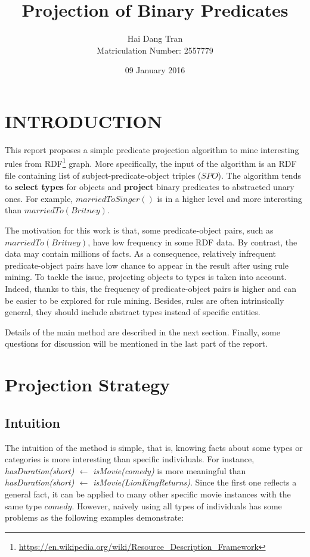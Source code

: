 \documentclass{acm_proc_article-sp}
\begin{document}
\title{Projection of Binary Predicates}
\author{
\alignauthor
Hai Dang Tran\\Matriculation Number: 2557779
}
\date{09 January 2016}

\maketitle

\section{INTRODUCTION}
This report proposes a simple predicate projection algorithm to mine interesting rules from RDF\footnote{\url{https://en.wikipedia.org/wiki/Resource_Description_Framework}} graph. More specifically, the input of the algorithm is an RDF file containing list of subject-predicate-object triples ($SPO$). The algorithm tends to \textbf{select types} for objects and \textbf{project} binary predicates to abstracted unary ones. For example, $marriedToSinger()$ is in a higher level and more interesting than $marriedTo(Britney)$.

The motivation for this work is that, some predicate-object pairs, such as $marriedTo(Britney)$, have low frequency in some RDF data. By contrast, the data may contain millions of facts. As a consequence, relatively infrequent predicate-object pairs have low chance to appear in the result after using rule mining. To tackle the issue, projecting objects to types is taken into account. Indeed, thanks to this, the frequency of predicate-object pairs is higher and can be easier to be explored for rule mining. Besides, rules are often intrinsically general, they should include abstract types instead of specific entities.

Details of the main method are described in the next section. Finally, some questions for discussion will be mentioned in the last part of the report.

\section{Projection Strategy}

\subsection{Intuition}

The intuition of the method is simple, that is, knowing facts about some types or categories is more interesting than specific individuals. For instance, \textit{hasDuration(short) $\leftarrow$ isMovie(comedy)} is more meaningful than \textit{hasDuration(short) $\leftarrow$ isMovie(LionKingReturns)}. Since the first one reflects a general fact, it can be applied to many other specific movie instances with the same type $comedy$. However, naively using all types of individuals has some problems as the following examples demonstrate:
\end{document}
